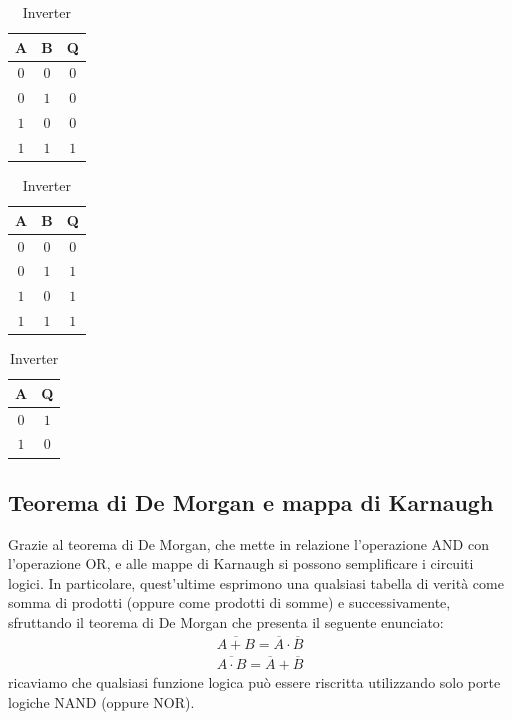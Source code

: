 \documentclass[a4paper,12pt]{article}
\begin{document}
\begin{table}[h]
	\parbox{.30\linewidth}{
		\centering
		\setlength{\tabcolsep}{10pt}
		\begin{tabular}{cc|c}
			\textbf{A} & \textbf{B} & \textbf{Q} \\
			\midrule
			$0$        & $0$        & $0$        \\
			$0$        & $1$        & $0$        \\
			$1$        & $0$        & $0$        \\
			$1$        & $1$        & $1$        \\
		\end{tabular}
		\caption{AND o prodotto logico}
	}
	\hfil
	\parbox{.30\linewidth}{
		\centering
		\setlength{\tabcolsep}{10pt}
		\begin{tabular}{cc|c}
			\textbf{A} & \textbf{B} & \textbf{Q} \\
			\midrule
			$0$        & $0$        & $0$        \\
			$0$        & $1$        & $1$        \\
			$1$        & $0$        & $1$        \\
			$1$        & $1$        & $1$        \\
		\end{tabular}
		\caption{OR o somma logica}
	}
	\hfil
	\parbox{.30\linewidth}{
		\centering
		\setlength{\tabcolsep}{10pt}
		\begin{tabular}{c|c}
			\textbf{A} & \textbf{Q} \\
			\midrule
			$0$        & $1$        \\
			$1$        & $0$        \\
		\end{tabular}
		\caption{Inverter}
		\label{tab:inverter-tabella-verita}
	}
\end{table}

\subsection*{Teorema di De Morgan e mappa di Karnaugh}
Grazie al teorema di De Morgan, che mette in relazione l'operazione AND con l'operazione OR, e alle mappe di Karnaugh si possono semplificare i circuiti logici. In particolare, quest'ultime esprimono una qualsiasi tabella di verità come somma di prodotti (oppure come prodotti di somme) e successivamente, sfruttando il teorema di De Morgan che presenta il seguente enunciato:
\begin{align*}
	\overline{A + B} = \overline{A} \cdot \overline{B} \\
	\overline{A \cdot B} = \overline{A} + \overline{B}
\end{align*}
ricaviamo che qualsiasi funzione logica può essere riscritta utilizzando solo porte logiche NAND (oppure NOR).
\end{document}
